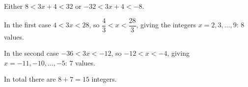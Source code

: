 Either $8<3x+4<32$ or $-32<3x+4<-8$.

In the first case $4<3x<28$, so $\dfrac{4}{3}<x<\dfrac{28}{3}$, giving the integers $x=2,3,\dots,9$: $8$ values.

In the second case $-36<3x<-12$, so $-12<x<-4$, giving $x=-11,-10,\dots,-5$: $7$ values.

In total there are $8+7=\boxed{15}$ integers.
